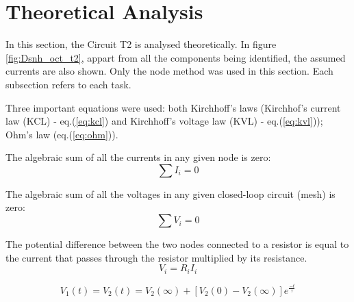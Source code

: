 
\section{Theoretical Analysis}
\label{sec:analysis}



In this section, the Circuit T2 is analysed theoretically. In figure \ref{fig:Dsnh_oct_t2},
appart from all the components being identified, the assumed currents are also shown.
Only the node method was used in this section. Each subsection refers to each task.


Three important equations were used: both Kirchhoff's laws (Kirchhof's current law (KCL)
- eq.(\ref{eq:kcl}) and Kirchhoff's voltage law (KVL) - eq.(\ref{eq:kvl})); Ohm's law
(eq.(\ref{eq:ohm})).

The algebraic sum of all the currents in any given node is zero:
\begin{equation}
	\sum I_i = 0
	\label{eq:kcl}
\end{equation}

The algebraic sum of all the voltages in any given closed-loop circuit (mesh) is zero:
\begin{equation}
	\sum V_i = 0
	\label{eq:kvl}
\end{equation}

The potential difference between the two nodes connected to a resistor is equal to the current that 
passes through the resistor multiplied by its resistance.
\begin{equation}
	V_i = R_iI_i
	\label{eq:ohm}
\end{equation}

\begin{equation}
	V_1(t) = V_2(t) = V_2(\infty) + [V_2(0) - V_2(\infty)]e^{\frac{-t}{\tau}}
\end{equation}



